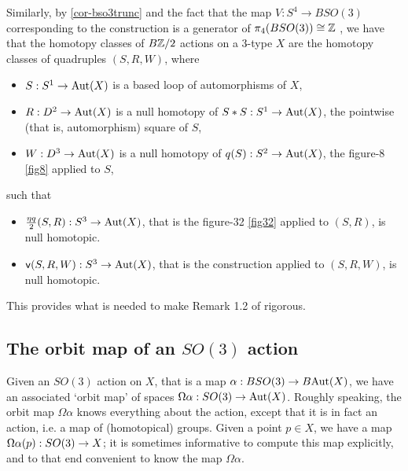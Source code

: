 \documentclass{amsart}
\begin{document}


\begin{remark}[Actions of $B \ZZ/2$]
\label{rem:B2Z2action}
Similarly, by \cref{cor-bso3trunc} and the fact that the map $V:S^4 \to BSO(3)$ corresponding to the \rain construction is a generator of $\pi_4(BSO(3)) \cong \mathbb Z$ , we have that the homotopy classes of $B\ZZ/2$ actions on a 3-type $X$ are the homotopy classes of quadruples $(S,R,W)$, where 
\begin{itemize}
\item $S: S^1 \rightarrow \mathrm{Aut}(X)$ is a based loop of automorphisms of $X$,
\item $R: D^2 \rightarrow \mathrm{Aut}(X)$ is a null homotopy of $S \ast S: S^1 \rightarrow \mathrm{Aut}(X)$, the pointwise (that is, automorphism) square of $S$,
\item $W: D^3 \rightarrow \mathrm{Aut}(X)$ is a null homotopy of $q(S): S^2 \rightarrow \mathrm{Aut}(X)$, the figure-8 \cref{fig8} applied to $S$,
\end{itemize}
such that
\begin{itemize}
\item $\frac{\eta q}{2} (S,R) : S^3 \rightarrow \mathrm{Aut}(X)$, that is the figure-32 \cref{fig32} applied to $(S,R)$, is null homotopic.
\item $\mathsf{v}(S,R,W): S^3 \rightarrow \mathrm{Aut}(X)$, that is the \rain construction  applied to $(S,R,W)$, is null homotopic.
\end{itemize}

This provides what is needed to make Remark 1.2 of \cite{mne} rigorous. %
\end{remark}



\subsection{The orbit map of an $SO(3)$ action}

Given an $SO(3)$ action on $X$, that is a map $\alpha: BSO(3) \rightarrow B\mathrm{Aut}(X)$, we have an associated `orbit map' of spaces $\Omega \alpha: SO(3) \rightarrow \mathrm{Aut}(X)$.  Roughly speaking, the orbit map $\Omega \alpha$ knows everything about the action, except that it is in fact an action, i.e. a map of (homotopical) groups.  Given a point $p \in X$, we have a map $\Omega \alpha (p) : SO(3) \rightarrow X$; it is sometimes informative to compute this map explicitly, and to that end convenient to know the map $\Omega \alpha$.  
\end{document}
